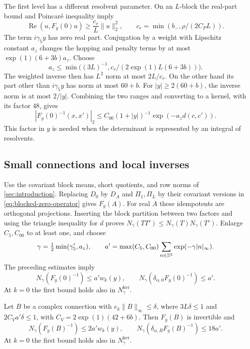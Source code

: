 The first level has a different resolvent parameter. On an $L$-block
the real-part bound and Poincar\'e inequality imply
\[
 \operatorname{Re}(u,F_y(0)u)\ge\frac{c_r}{L}\|u\|_2^2,
 \qquad c_r=\min(b_-,\rho/(2C_PL)).
\]
The term $i\gamma_5y$ has zero real part. Conjugation by a weight with
Lipschitz constant $a_z$ changes the hopping and penalty terms by at
most $\exp(1)(6+3b)a_z$. Choose
\[
 a_z\le\min\bigl((3L)^{-1},c_r/(2\exp(1)L(6+3b))\bigr).
\]
The weighted inverse then has $L^2$ norm at most $2L/c_r$.
On the other hand its part other than $i\gamma_5y$ has norm at most
$60+b$. For $|y|\ge2(60+b)$, the inverse norm is at most $2/|y|$.
Combining the two ranges and converting to a kernel, with its factor
$48$, gives
\begin{equation}\label{eq:level-zero-kernel}
 |F_y(0)^{-1}(x,x')|_2\le C_{00}(1+|y|)^{-1}
                         \exp(-a_zd(c,c')).
\end{equation}
This factor in $y$ is needed when the determinant is represented by an
integral of resolvents.

\subsection{Small connections and local inverses}\label{subsec:local-inverses}

Use the covariant block means, short quotients, and row norms of
\cref{sec:introduction}. Replacing $D_0$ by $D_A$ and $\Pi_1,\Pi_L$
by their covariant versions in \eqref{eq:blocked-zero-operator}
gives $F_y(A)$. For real
$A$ these idempotents are orthogonal projections.
Inserting the block partition between two factors and
using the triangle inequality for $d$ proves
$N_\gamma(TT')\le N_\gamma(T)N_\gamma(T')$.
Enlarge $C_5,C_{00}$ to at least one, and choose
\[
 \gamma=\tfrac12\min(\gamma_5',a_z),\qquad
 a'=\max(C_5,C_{00})\sum_{n\in\mathbb Z^3}\exp(-\gamma|n|_\infty).
\]
The preceding estimates imply
\begin{equation}\label{eq:zero-row-bounds}
 N_\gamma(F_y(0)^{-1})\le a'w_k(y),\qquad
 N_\gamma(\delta_{\alpha,0}F_y(0)^{-1})\le a'.
\end{equation}
At $k=0$ the first bound holds also in $N_\gamma^{\mathrm{ker}}$.

\begin{proposition}\label{prop:small-connection-inverse}
Let $B$ be a complex connection with $e_k\|B\|_\infty\le\delta$, where
$3L\delta\le1$ and $2C_Va'\delta\le1$, with
$C_V=2\exp(1)(42+6b)$. Then $F_y(B)$ is invertible and
\begin{equation}\label{eq:small-row-bounds}
 N_\gamma(F_y(B)^{-1})\le2a'w_k(y),\qquad
 N_\gamma(\delta_{\alpha,B}F_y(B)^{-1})\le18a'.
\end{equation}
At $k=0$ the first bound holds also in $N_\gamma^{\mathrm{ker}}$.
\end{proposition}

